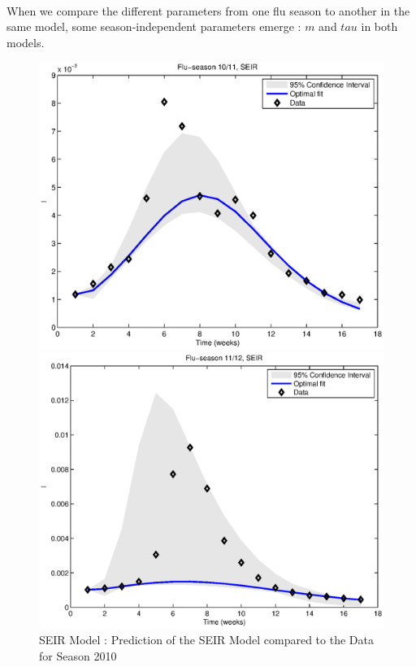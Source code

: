 \documentclass[11pt, a4paper]{article}
\begin{document}
\paragraph{}
When we compare the different parameters from one flu season to another in the same model, some season-independent parameters emerge :  $m$ and $tau$ in both models.

\begin{figure}[h]
\FloatBarrier
\centering
    \includegraphics[height = 0.25\textheight]{figures/SEIR_prediction_season1.eps}
    \caption{SEIR Model : Prediction of the SEIR Model compared to the Data for Season 2010}
    \label{fig:seir_pred1}
    \includegraphics[height = 0.25\textheight]{figures/SEIR_prediction_season2.eps}

\end{figure}
\end{document}

